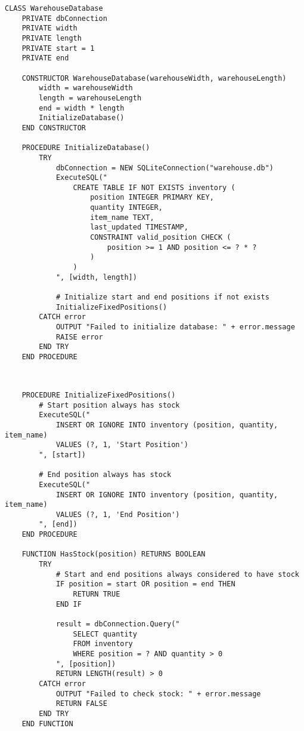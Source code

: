 \newpage

\begin{verbatim}
CLASS WarehouseDatabase
    PRIVATE dbConnection
    PRIVATE width
    PRIVATE length
    PRIVATE start = 1
    PRIVATE end

    CONSTRUCTOR WarehouseDatabase(warehouseWidth, warehouseLength)
        width = warehouseWidth
        length = warehouseLength
        end = width * length
        InitializeDatabase()
    END CONSTRUCTOR
    
    PROCEDURE InitializeDatabase()
        TRY
            dbConnection = NEW SQLiteConnection("warehouse.db")
            ExecuteSQL("
                CREATE TABLE IF NOT EXISTS inventory (
                    position INTEGER PRIMARY KEY,
                    quantity INTEGER,
                    item_name TEXT,
                    last_updated TIMESTAMP,
                    CONSTRAINT valid_position CHECK (
                        position >= 1 AND position <= ? * ?
                    )
                )
            ", [width, length])
            
            # Initialize start and end positions if not exists
            InitializeFixedPositions()
        CATCH error
            OUTPUT "Failed to initialize database: " + error.message
            RAISE error
        END TRY
    END PROCEDURE

\end{verbatim}
\newpage
\begin{verbatim}
    
    
    PROCEDURE InitializeFixedPositions()
        # Start position always has stock
        ExecuteSQL("
            INSERT OR IGNORE INTO inventory (position, quantity, item_name)
            VALUES (?, 1, 'Start Position')
        ", [start])
        
        # End position always has stock
        ExecuteSQL("
            INSERT OR IGNORE INTO inventory (position, quantity, item_name)
            VALUES (?, 1, 'End Position')
        ", [end])
    END PROCEDURE
    
    FUNCTION HasStock(position) RETURNS BOOLEAN
        TRY
            # Start and end positions always considered to have stock
            IF position = start OR position = end THEN
                RETURN TRUE
            END IF
            
            result = dbConnection.Query("
                SELECT quantity 
                FROM inventory 
                WHERE position = ? AND quantity > 0
            ", [position])
            RETURN LENGTH(result) > 0
        CATCH error
            OUTPUT "Failed to check stock: " + error.message
            RETURN FALSE
        END TRY
    END FUNCTION
\end{verbatim}
